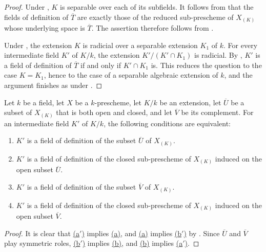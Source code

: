 \begin{proof}
Under , $K$ is separable over each of its
subfields.
It follows from  that the fields of definition of
$\overline T$ are exactly those of the reduced sub-prescheme of
$X_{(K)}$ whose underlying space is $\overline T$.
The assertion therefore follows from .

Under , the extension $K$ is radicial over a
separable extension $K_1$ of $k$.
For every intermediate field $K'$ of $K/k$, the extension
$K'/(K'\cap K_1)$ is radicial.
By , $K'$ is a field of definition of
$\overline T$ if and only if $K'\cap K_1$ is.
This reduces the question to the case $K=K_1$, hence to the case of
a separable algebraic extension of $k$, and the argument finishes as
under .
\end{proof}

\begin{proposition}[4.9.6]
\label{IV.4.9.6}
Let $k$ be a field, let $X$ be a $k$-prescheme, let $K/k$ be an
extension, let $\overline U$ be a subset of $X_{(K)}$ that is both
open and closed, and let $\overline V$ be its complement.
For an intermediate field $K'$ of $K/k$, the following conditions
are equivalent:
\begin{enumerate}
\item[\rm(a)]
\label{IV.4.9.6.a}
$K'$ is a field of definition of the subset $\overline U$ of
$X_{(K)}$.
\item[\rm(a$'$)]
\label{IV.4.9.6.aprime}
$K'$ is a field of definition of the closed sub-prescheme of
$X_{(K)}$ induced on the open subset $\overline U$.
\item[\rm(b)]
\label{IV.4.9.6.b}
$K'$ is a field of definition of the subset $\overline V$ of
$X_{(K)}$.
\item[\rm(b$'$)]
\label{IV.4.9.6.bprime}
$K'$ is a field of definition of the closed sub-prescheme of
$X_{(K)}$ induced on the open subset $\overline V$.
\end{enumerate}
\end{proposition}

\begin{proof}
It is clear that
{\hyperlink{ega4.c04.sec.4-9-6-aprime}{(a$'$)}} implies
{\hyperlink{ega4.c04.sec.4-9-6-a}{(a)}}, and
{\hyperlink{ega4.c04.sec.4-9-6-a}{(a)}} implies
{\hyperlink{ega4.c04.sec.4-9-6-bprime}{(b$'$)}} by .
Since $\overline U$ and $\overline V$ play symmetric roles,
{\hyperlink{ega4.c04.sec.4-9-6-bprime}{(b$'$)}} implies
{\hyperlink{ega4.c04.sec.4-9-6-b}{(b)}}, and
{\hyperlink{ega4.c04.sec.4-9-6-b}{(b)}} implies
{\hyperlink{ega4.c04.sec.4-9-6-aprime}{(a$'$)}}.
\end{proof}

